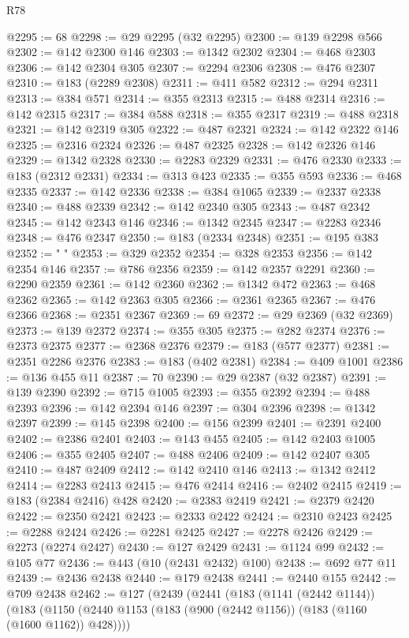 \begin{lexlean}{R78}
\begin{coremodule}
@2295 := 68
@2298 := @29 @2295 (@32 @2295)
@2300 := @139 @2298 @566
@2302 := @142 @2300 @146
@2303 := @1342 @2302
@2304 := @468 @2303
@2306 := @142 @2304 @305
@2307 := @2294 @2306
@2308 := @476 @2307
@2310 := @183 (@2289 @2308)
@2311 := @411 @582
@2312 := @294 @2311
@2313 := @384 @571
@2314 := @355 @2313
@2315 := @488 @2314
@2316 := @142 @2315
@2317 := @384 @588
@2318 := @355 @2317
@2319 := @488 @2318
@2321 := @142 @2319 @305
@2322 := @487 @2321
@2324 := @142 @2322 @146
@2325 := @2316 @2324
@2326 := @487 @2325
@2328 := @142 @2326 @146
@2329 := @1342 @2328
@2330 := @2283 @2329
@2331 := @476 @2330
@2333 := @183 (@2312 @2331)
@2334 := @313 @423
@2335 := @355 @593
@2336 := @468 @2335
@2337 := @142 @2336
@2338 := @384 @1065
@2339 := @2337 @2338
@2340 := @488 @2339
@2342 := @142 @2340 @305
@2343 := @487 @2342
@2345 := @142 @2343 @146
@2346 := @1342 @2345
@2347 := @2283 @2346
@2348 := @476 @2347
@2350 := @183 (@2334 @2348)
@2351 := @195 @383
@2352 := " "
@2353 := @329 @2352
@2354 := @328 @2353
@2356 := @142 @2354 @146
@2357 := @786 @2356
@2359 := @142 @2357 @2291
@2360 := @2290 @2359
@2361 := @142 @2360
@2362 := @1342 @472
@2363 := @468 @2362
@2365 := @142 @2363 @305
@2366 := @2361 @2365
@2367 := @476 @2366
@2368 := @2351 @2367
@2369 := 69
@2372 := @29 @2369 (@32 @2369)
@2373 := @139 @2372
@2374 := @355 @305
@2375 := @282 @2374
@2376 := @2373 @2375
@2377 := @2368 @2376
@2379 := @183 (@577 @2377)
@2381 := @2351 @2286 @2376
@2383 := @183 (@402 @2381)
@2384 := @409 @1001
@2386 := @136 @455 @11
@2387 := 70
@2390 := @29 @2387 (@32 @2387)
@2391 := @139 @2390
@2392 := @715 @1005
@2393 := @355 @2392
@2394 := @488 @2393
@2396 := @142 @2394 @146
@2397 := @304 @2396
@2398 := @1342 @2397
@2399 := @145 @2398
@2400 := @156 @2399
@2401 := @2391 @2400
@2402 := @2386 @2401
@2403 := @143 @455
@2405 := @142 @2403 @1005
@2406 := @355 @2405
@2407 := @488 @2406
@2409 := @142 @2407 @305
@2410 := @487 @2409
@2412 := @142 @2410 @146
@2413 := @1342 @2412
@2414 := @2283 @2413
@2415 := @476 @2414
@2416 := @2402 @2415
@2419 := @183 (@2384 @2416) @428
@2420 := @2383 @2419
@2421 := @2379 @2420
@2422 := @2350 @2421
@2423 := @2333 @2422
@2424 := @2310 @2423
@2425 := @2288 @2424
@2426 := @2281 @2425
@2427 := @2278 @2426
@2429 := @2273 (@2274 @2427)
@2430 := @127 @2429
@2431 := @1124 @99
@2432 := @105 @77
@2436 := @443 (@10 (@2431 @2432) @100)
@2438 := @692 @77 @11
@2439 := @2436 @2438
@2440 := @179 @2438
@2441 := @2440 @155
@2442 := @709 @2438
@2462 := @127
    (@2439
      (@2441
        (@183
          (@1141 (@2442 @1144))
          (@183
            (@1150 (@2440 @1153 (@183 (@900 (@2442 @1156)) (@183 (@1160 (@1600 @1162)) @428))))

\end{coremodule}
\end{lexlean}
